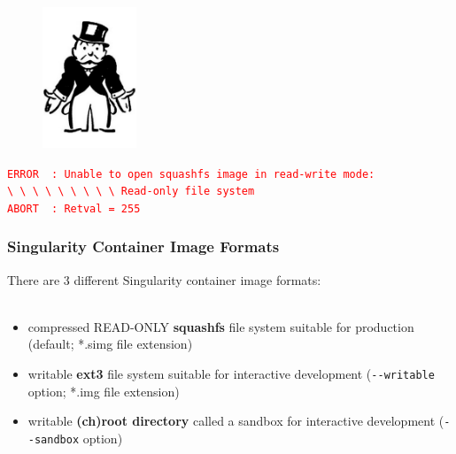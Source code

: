 \documentclass{beamer}
\begin{document}
\begin{frame}
   \frametitle{}
   \begin{figure}[htbp]
      \includegraphics[width=0.25\textwidth]{images/do-not-pass-go.png}
   \end{figure}
   \textcolor{red}{\lstinline{ERROR  : Unable to open squashfs image in read-write mode:}} \\
   \textcolor{red}{\lstinline{\ \ \ \ \ \ \ \ \ Read-only file system}} \\
   \textcolor{red}{\lstinline{ABORT  : Retval = 255}}
\end{frame}

\begin{frame}
   \frametitle{Singularity Container Image Formats}
   There are 3 different Singularity container image formats: 
   \ \\ \ \\
   \begin{itemize}
      \setlength\itemsep{1.0em}
      \item compressed READ-ONLY \textbf{squashfs} file system suitable 
         for production (default; *.simg file extension)
      \item writable \textbf{ext3} file system  suitable for interactive 
         development (\lstinline{--writable} option; *.img file extension)
      \item writable \textbf{(ch)root directory} called a sandbox for 
         interactive development (\lstinline{--sandbox} option)
   \end{itemize}
\end{frame}
\end{document}
